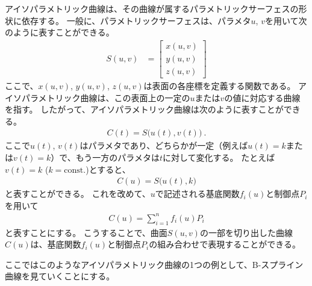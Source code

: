 

アイソパラメトリック曲線は、その曲線が属するパラメトリックサーフェスの形状に依存する。
一般に、パラメトリックサーフェスは、パラメタ$u$, $v$を用いて次のように表すことができる。
\begin{align*}
  S(u, v) &=
  \left[
  \begin{array}{c}
    x(u, v)\\
    y(u, v)\\
    z(u, v)
  \end{array}
  \right]
\end{align*}
ここで、$x(u,v)$, $y(u,v)$, $z(u,v)$は表面の各座標を定義する関数である。
アイソパラメトリック曲線は、この表面上の一定の$u$または$v$の値に対応する曲線を指す。
したがって、アイソパラメトリック曲線は次のように表すことができる。
\begin{align*}
  C(t) = S\big(u(t), v(t)\big)\ .
\end{align*}
ここで$u(t)$, $v(t)$はパラメタであり、どちらかが一定（例えば$u(t)=k$または$v(t)=k$）で、もう一方のパラメタは$t$に対して変化する。
たとえば$v(t) = k$ ($k = \text{const.}$)とすると、
\begin{align*}
  C(u) = S\big(u(t), k\big)
\end{align*}
と表すことができる。
これを改めて、$u$で記述される基底関数$f_i(u)$と制御点$P_i$を用いて
\begin{align*}
  C(u) = \sum_{i=1}^nf_i(u)P_i
\end{align*}
と表すことにする。
こうすることで、曲面$S(u, v)$の一部を切り出した曲線$C(u)$は、基底関数$f_i(u)$と制御点$P_i$の組み合わせで表現することができる。

ここではこのようなアイソパラメトリック曲線の1つの例として、B-スプライン曲線を見ていくことにする。



